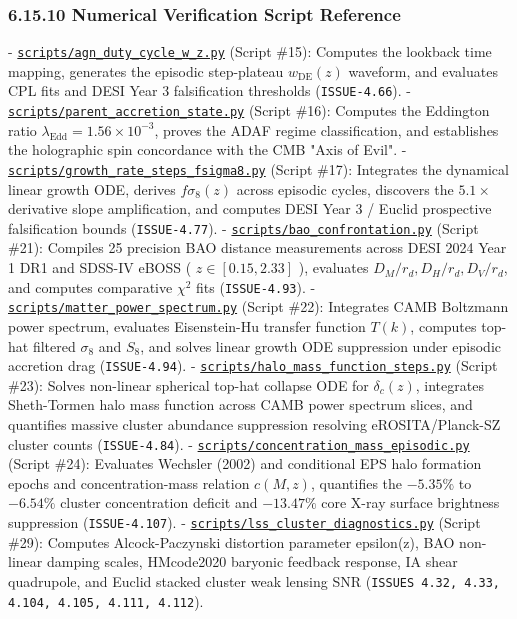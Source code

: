 \documentclass[11pt,a4paper]{article}
\theoremstyle{definition}
\theoremstyle{remark}
\begin{document}
\subsubsection{6.15.10 Numerical Verification Script Reference}
- \href{../../scripts/agn_duty_cycle_w_z.py}{\texttt{scripts/agn_duty_cycle_w_z.py}} (Script \#15): Computes the lookback time mapping, generates the episodic step-plateau $w_{\text{DE}}(z)$ waveform, and evaluates CPL fits and DESI Year 3 falsification thresholds (\texttt{ISSUE-4.66}).
- \href{../../scripts/parent_accretion_state.py}{\texttt{scripts/parent_accretion_state.py}} (Script \#16): Computes the Eddington ratio $\lambda_{\text{Edd}} = 1.56 \times 10^{-3}$, proves the ADAF regime classification, and establishes the holographic spin concordance with the CMB "Axis of Evil".
- \href{../../scripts/growth_rate_steps_fsigma8.py}{\texttt{scripts/growth_rate_steps_fsigma8.py}} (Script \#17): Integrates the dynamical linear growth ODE, derives $f\sigma_8(z)$ across episodic cycles, discovers the $5.1\times$ derivative slope amplification, and computes DESI Year 3 / Euclid prospective falsification bounds (\texttt{ISSUE-4.77}).
- \href{../../scripts/bao_confrontation.py}{\texttt{scripts/bao_confrontation.py}} (Script \#21): Compiles 25 precision BAO distance measurements across DESI 2024 Year 1 DR1 and SDSS-IV eBOSS ( $z \in [0.15, 2.33]$ ), evaluates $D_M/r_d, D_H/r_d, D_V/r_d$, and computes comparative $\chi^2$ fits (\texttt{ISSUE-4.93}).
- \href{../../scripts/matter_power_spectrum.py}{\texttt{scripts/matter_power_spectrum.py}} (Script \#22): Integrates CAMB Boltzmann power spectrum, evaluates Eisenstein-Hu transfer function $T(k)$, computes top-hat filtered $\sigma_8$ and $S_8$, and solves linear growth ODE suppression under episodic accretion drag (\texttt{ISSUE-4.94}).
- \href{../../scripts/halo_mass_function_steps.py}{\texttt{scripts/halo_mass_function_steps.py}} (Script \#23): Solves non-linear spherical top-hat collapse ODE for $\delta_c(z)$, integrates Sheth-Tormen halo mass function across CAMB power spectrum slices, and quantifies massive cluster abundance suppression resolving eROSITA/Planck-SZ cluster counts (\texttt{ISSUE-4.84}).
- \href{../../scripts/concentration_mass_episodic.py}{\texttt{scripts/concentration_mass_episodic.py}} (Script \#24): Evaluates Wechsler (2002) and conditional EPS halo formation epochs and concentration-mass relation $c(M, z)$, quantifies the $-5.35\%$ to $-6.54\%$ cluster concentration deficit and $-13.47\%$ core X-ray surface brightness suppression (\texttt{ISSUE-4.107}).
- \href{../../scripts/lss_cluster_diagnostics.py}{\texttt{scripts/lss_cluster_diagnostics.py}} (Script \#29): Computes Alcock-Paczynski distortion parameter epsilon(z), BAO non-linear damping scales, HMcode2020 baryonic feedback response, IA shear quadrupole, and Euclid stacked cluster weak lensing SNR (\texttt{ISSUES 4.32, 4.33, 4.104, 4.105, 4.111, 4.112}).
\end{document}
